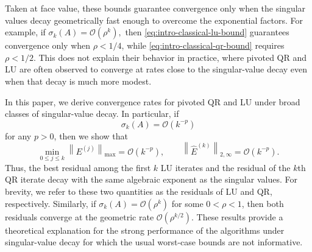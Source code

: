 \documentclass[11pt]{article}
\theoremstyle{definition}
\theoremstyle{remark}
\newcommand{\norm}[1]{\left\lVert #1\right\rVert}
\begin{document}
Taken at face value, these bounds guarantee convergence only when the
singular values decay geometrically fast enough to overcome the
exponential factors. For example, if
$
    \sigma_k(A)=\mathcal O(\rho^k),
$
then \eqref{eq:intro-classical-lu-bound} guarantees convergence only when
$\rho<1/4$, while \eqref{eq:intro-classical-qr-bound} requires
$\rho<1/2$. This does not explain their behavior in practice, where
pivoted QR and LU are often observed to converge at rates close to the
singular-value decay even when that decay is much more modest.



In this paper, we derive convergence rates for pivoted QR and LU under
broad classes of singular-value decay. In particular, if
\[
    \sigma_k(A)=\mathcal O(k^{-p})
\]
for any $p>0$, then we show that
\begin{equation*}
    \min_{0\le j\le k}\norm{E^{(j)}}_{\max}
    =
    \mathcal O(k^{-p}),
    \qquad
    \norm{\widehat E^{(k)}}_{2,\infty}
    =
    \mathcal O(k^{-p}).
\end{equation*}
Thus, the best residual among the first $k$ LU iterates and the residual
of the $k$th QR iterate decay with the same algebraic exponent as the
singular values. For brevity, we refer to these two quantities as the
residuals of LU and QR, respectively. Similarly, if
$\sigma_k(A)=\mathcal O(\rho^k)$ for some $0<\rho<1$, then both residuals
converge at the geometric rate $\mathcal O(\rho^{k/2})$. These results
provide a theoretical explanation for the strong performance of the
algorithms under singular-value decay for which the usual worst-case
bounds are not informative.

\end{document}
